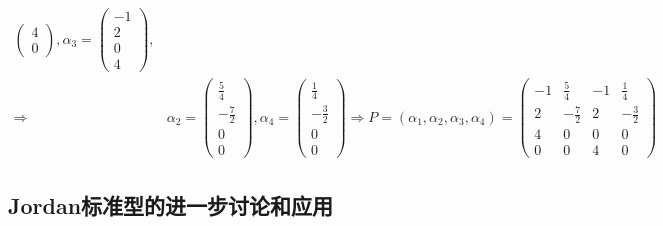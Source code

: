 \begin{solution}
\begin{align*}
\begin{pmatrix}
                        4\\
                        0
                      \end{pmatrix},
   \alpha_3=
                      \begin{pmatrix}
                        -1\\
                        2\\
                        0\\
                        4
                      \end{pmatrix},\\
    \Longrightarrow & \alpha_2=
      \begin{pmatrix}
        \frac{5}{4}\\
        -\frac{7}{2}\\
        0\\
        0
      \end{pmatrix}, 
      \alpha_4=
      \begin{pmatrix}
        \frac{1}{4}\\
        -\frac{3}{2}\\
        0\\
        0
      \end{pmatrix}\Longrightarrow
      P=(\alpha_1,\alpha_2,\alpha_3,\alpha_4)=
    \begin{pmatrix}
      -1&\frac{5}{4}&-1&\frac{1}{4}\\
      2&-\frac{7}{2}&2&-\frac{3}{2}\\
      4&0&0&0\\
      0&0&4&0
    \end{pmatrix}
  \end{align*}
\end{solution}

\subsection{Jordan标准型的进一步讨论和应用}


